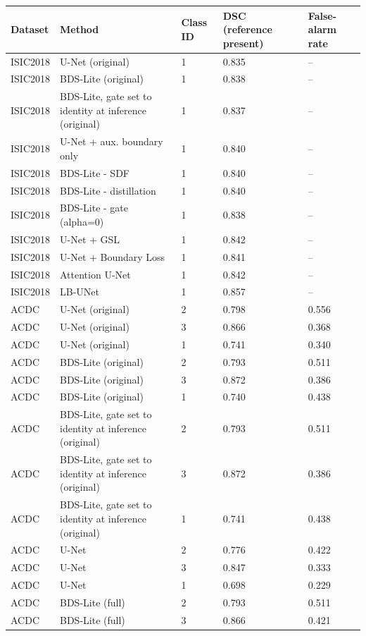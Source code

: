 \begin{longtable}{lllll}
\toprule
Dataset & Method & Class ID & DSC (reference present) & False-alarm rate \\
\midrule
ISIC2018 & U-Net (original) & 1 & 0.835 & -- \\
ISIC2018 & BDS-Lite (original) & 1 & 0.838 & -- \\
ISIC2018 & BDS-Lite, gate set to identity at inference (original) & 1 & 0.837 & -- \\
ISIC2018 & U-Net + aux. boundary only & 1 & 0.840 & -- \\
ISIC2018 & BDS-Lite - SDF & 1 & 0.840 & -- \\
ISIC2018 & BDS-Lite - distillation & 1 & 0.840 & -- \\
ISIC2018 & BDS-Lite - gate (alpha=0) & 1 & 0.838 & -- \\
ISIC2018 & U-Net + GSL & 1 & 0.842 & -- \\
ISIC2018 & U-Net + Boundary Loss & 1 & 0.841 & -- \\
ISIC2018 & Attention U-Net & 1 & 0.842 & -- \\
ISIC2018 & LB-UNet & 1 & 0.857 & -- \\
ACDC & U-Net (original) & 2 & 0.798 & 0.556 \\
ACDC & U-Net (original) & 3 & 0.866 & 0.368 \\
ACDC & U-Net (original) & 1 & 0.741 & 0.340 \\
ACDC & BDS-Lite (original) & 2 & 0.793 & 0.511 \\
ACDC & BDS-Lite (original) & 3 & 0.872 & 0.386 \\
ACDC & BDS-Lite (original) & 1 & 0.740 & 0.438 \\
ACDC & BDS-Lite, gate set to identity at inference (original) & 2 & 0.793 & 0.511 \\
ACDC & BDS-Lite, gate set to identity at inference (original) & 3 & 0.872 & 0.386 \\
ACDC & BDS-Lite, gate set to identity at inference (original) & 1 & 0.741 & 0.438 \\
ACDC & U-Net & 2 & 0.776 & 0.422 \\
ACDC & U-Net & 3 & 0.847 & 0.333 \\
ACDC & U-Net & 1 & 0.698 & 0.229 \\
ACDC & BDS-Lite (full) & 2 & 0.793 & 0.511 \\
ACDC & BDS-Lite (full) & 3 & 0.866 & 0.421 \\

\end{longtable}

